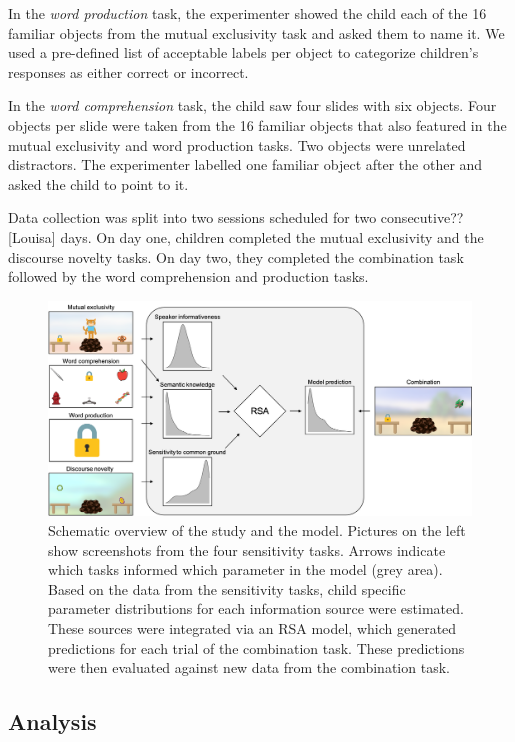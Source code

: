 \documentclass[
  man,floatsintext]{apa6}
\begin{document}
In the \emph{word production} task, the experimenter showed the child each of the 16 familiar objects from the mutual exclusivity task and asked them to name it. We used a pre-defined list of acceptable labels per object to categorize children's responses as either correct or incorrect.

In the \emph{word comprehension} task, the child saw four slides with six objects. Four objects per slide were taken from the 16 familiar objects that also featured in the mutual exclusivity and word production tasks. Two objects were unrelated distractors. The experimenter labelled one familiar object after the other and asked the child to point to it.

Data collection was split into two sessions scheduled for two consecutive?? {[}Louisa{]} days. On day one, children completed the mutual exclusivity and the discourse novelty tasks. On day two, they completed the combination task followed by the word comprehension and production tasks.

\begin{figure}
\includegraphics[width=1\linewidth]{./figures/fig1} \caption{Schematic overview of the study and the model. Pictures on the left show screenshots from the four sensitivity tasks. Arrows indicate which tasks informed which parameter in the model (grey area). Based on the data from the sensitivity tasks, child specific parameter distributions for each information source were estimated. These sources were integrated via an RSA model, which generated predictions for each trial of the combination task. These predictions were then evaluated against new data from the combination task.}\label{fig:fig1}
\end{figure}

\hypertarget{analysis}{%
\subsection{Analysis}\label{analysis}}
\end{document}
